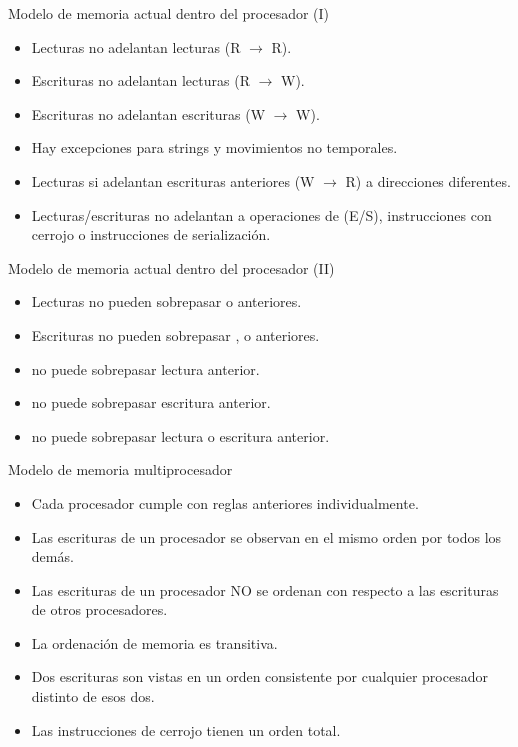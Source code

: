 \begin{frame}[t]{Modelo de memoria actual dentro del procesador (I)}
\begin{itemize}
  \item Lecturas no adelantan lecturas (R $\rightarrow$ R).
  \item Escrituras no adelantan lecturas (R $\rightarrow$ W).
  \item Escrituras no adelantan escrituras (W $\rightarrow$ W).
  \item Hay excepciones para strings y movimientos no temporales.
  \item Lecturas si adelantan escrituras anteriores (W $\rightarrow$ R) a direcciones diferentes.
  \item Lecturas/escrituras no adelantan a operaciones de (E/S), instrucciones con cerrojo o instrucciones de serialización.
\end{itemize}
\end{frame}

\begin{frame}[t]{Modelo de memoria actual dentro del procesador (II)}
\begin{itemize}
  \item Lecturas no pueden sobrepasar  o  anteriores.
  \item Escrituras no pueden sobrepasar ,  o  anteriores.
  \item {} no puede sobrepasar lectura anterior.
  \item {} no puede sobrepasar escritura anterior.
  \item {} no puede sobrepasar lectura o escritura anterior.
\end{itemize}
\end{frame}

\begin{frame}[t]{Modelo de memoria multiprocesador}
\begin{itemize}
  \item Cada procesador cumple con reglas anteriores individualmente.
  \item Las escrituras de un procesador se observan en el mismo orden por todos los demás.
  \item Las escrituras de un procesador NO se ordenan con respecto a las escrituras de otros procesadores.
  \item La ordenación de memoria es transitiva.
  \item Dos escrituras son vistas en un orden consistente por cualquier procesador distinto de esos dos.
  \item Las instrucciones de cerrojo tienen un orden total.
\end{itemize}
\end{frame}
